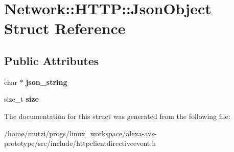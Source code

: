 \hypertarget{structNetwork_1_1HTTP_1_1JsonObject}{}\section{Network\+:\+:H\+T\+TP\+:\+:Json\+Object Struct Reference}
\label{structNetwork_1_1HTTP_1_1JsonObject}
\subsection*{Public Attributes}
\begin{DoxyCompactItemize}
\item 
\mbox{\label{structNetwork_1_1HTTP_1_1JsonObject_ac377a85a255b170a019a49dc268a2934}} 
char $\ast$ {\bfseries json\+\_\+string}
\item 
\mbox{\label{structNetwork_1_1HTTP_1_1JsonObject_a6c2fc1e835e83477ea06ae78dd1d83c9}} 
size\+\_\+t {\bfseries size}
\end{DoxyCompactItemize}


The documentation for this struct was generated from the following file\+:\begin{DoxyCompactItemize}
\item 
/home/mutzi/progs/linux\+\_\+workspace/alexa-\/avs-\/prototype/src/include/httpclientdirectiveevent.\+h\end{DoxyCompactItemize}
